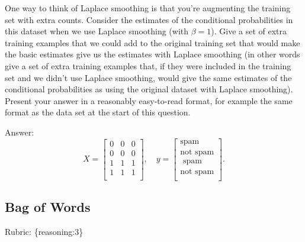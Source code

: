 \documentclass{article}
\def\rubric#1{\gre{Rubric: \{#1\}}}{}
\def\ans#1{\par\gre{Answer: #1}}
\def\blu#1{{\color{blu}#1}}
\def\gre#1{{\color{gre}#1}}
\begin{document}
One way to think of Laplace smoothing is that you're augmenting the training set with extra counts. Consider the estimates of the conditional probabilities in this dataset when we use Laplace smoothing (with $\beta = 1$). 
\blu{Give a set of extra training examples that we could add to the original training set that would make the basic estimates give us the estimates with Laplace smoothing} (in other words give a set of extra training examples that, if they were included in the training set and we didn't use Laplace smoothing, would give the same estimates of the conditional probabilities as using the original dataset with Laplace smoothing).
Present your answer in a reasonably easy-to-read format, for example the same format as the data set at the start of this question.
\ans{
	\[
	X = \begin{bmatrix}0 & 0 & 0\\0 & 0 &0\\ 1 & 1 & 1\\ 1 & 1 & 1\\\end{bmatrix}, \quad y = \begin{bmatrix}\text{spam}\\\text{not spam}\\\text{ spam}\\\text{not spam}\\\end{bmatrix}.
	\]}
\subsection{Bag of Words}
\rubric{reasoning:3}
\end{document}

